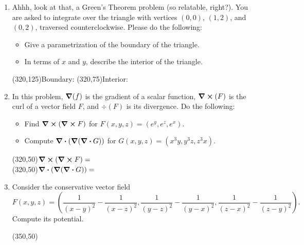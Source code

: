 \documentclass[12pt]{exam}
\begin{document}
\begin{enumerate} 

\item Ahhh, look at that, a Green's Theorem problem (so relatable, right?).  
You are asked to integrate over the triangle with vertices $(0,0)$, $(1,2)$, and $(0,2)$, traversed counterclockwise. Please do the following:
\begin{itemize}
  \item Give a parametrization of the boundary of the triangle.
  \item In terms of $x$ and $y$, describe the interior of the triangle.
\end{itemize}
\vfill
\begin{flushright}
\framebox(320,125){Boundary:\hspace{9cm}}
\framebox(320,75){Interior:\hspace{9cm}}
\end{flushright}

\item In this problem, $\grad(f)$ is the gradient of a scalar function, $\curl(F)$ is the curl of a vector field $F$, and $\div(F)$ is its divergence. Do the following:
\begin{itemize}
  \item Find $\curl(\curl F)$ for $F(x,y,z)=(e^y,e^z,e^x)$.
  \item Compute $\div(\grad(\div G))$ for $G(x,y,z)=(x^3y,y^3z,z^3x)$.
\end{itemize}
\vfill
\begin{flushright}
\framebox(320,50){$\curl(\curl F)=\phantom{aVENCERAPORQUESDANIFANTON}$}\\[6pt]
\framebox(320,50){$\div(\grad(\div G))=\phantom{aaVENCERAPORkeSDANIFANTON}$}
\end{flushright}

\newpage

\item Consider the conservative vector field 
$$F(x,y,z)=\left(\frac{1}{(x-y)^2}-\frac{1}{(x-z)^2},\frac{1}{(y-z)^2}-\frac{1}{(y-x)^2},\frac{1}{(z-x)^2}-\frac{1}{(z-y)^2}\right).$$
Compute its potential.
\vfill
\begin{flushright}
\framebox(350,50){}
\end{flushright}


\end{enumerate}
\end{document}
